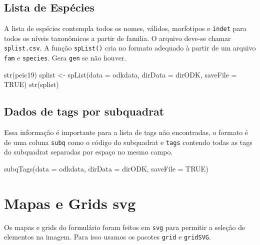 \documentclass[
  letterpaper,
]{report}
\newenvironment{Shaded}{\begin{snugshade}}{\end{snugshade}}
\newcommand{\AttributeTok}[1]{\textcolor[rgb]{0.40,0.45,0.13}{#1}}
\newcommand{\ConstantTok}[1]{\textcolor[rgb]{0.56,0.35,0.01}{#1}}
\newcommand{\FunctionTok}[1]{\textcolor[rgb]{0.28,0.35,0.67}{#1}}
\newcommand{\NormalTok}[1]{\textcolor[rgb]{0.00,0.23,0.31}{#1}}
\newcommand{\OtherTok}[1]{\textcolor[rgb]{0.00,0.23,0.31}{#1}}
\begin{document}
\subsection{Lista de Espécies}\label{lista-de-espuxe9cies}

A lista de espécies contempla todos os nomes, válidos, morfotipos e
\texttt{indet} para todos os níveis taxonômicos a partir de familia. O
arquivo deve-se chamar \texttt{splist.csv}. A função \texttt{spList()}
cria no formato adequado à partir de um arquivo \texttt{fam} e
\texttt{species}. Gera \texttt{gen} se não houver.

\begin{Shaded}
\begin{Highlighting}[]
\FunctionTok{str}\NormalTok{(peic19)}
\NormalTok{splist }\OtherTok{\textless{}{-}} \FunctionTok{spList}\NormalTok{(}\AttributeTok{data =}\NormalTok{ odkdata, }\AttributeTok{dirData =}\NormalTok{ dirODK, }\AttributeTok{saveFile =} \ConstantTok{TRUE}\NormalTok{)}
\FunctionTok{str}\NormalTok{(splist)}
\end{Highlighting}
\end{Shaded}

\subsection{Dados de tags por
subquadrat}\label{dados-de-tags-por-subquadrat}

Essa informação é importante para a lista de tags não encontradas, o
formato é de uma coluna \texttt{subq} como o código do subquadrat e
\texttt{tags} contendo todas as tags do subquadrat separadas por espaço
no mesmo campo.

\begin{Shaded}
\begin{Highlighting}[]
\FunctionTok{subqTags}\NormalTok{(}\AttributeTok{data =}\NormalTok{ odkdata, }\AttributeTok{dirData =}\NormalTok{ dirODK, }\AttributeTok{saveFile =} \ConstantTok{TRUE}\NormalTok{)}
\end{Highlighting}
\end{Shaded}

\section{Mapas e Grids svg}\label{mapas-e-grids-svg}

Os mapas e grids do formulário foram feitos em \texttt{svg} para
permitir a seleção de elementos na imagem. Para isso usamos os pacotes
\texttt{grid} e \texttt{gridSVG}.
\end{document}
